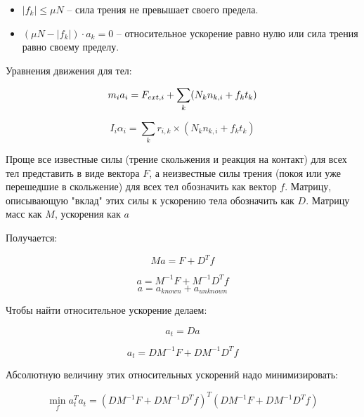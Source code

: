\documentclass{article}
\begin{document}
\begin{itemize}
    \item $|f_k| \le \mu N$ -- сила трения не превышает своего предела.
    \item $(\mu N - |f_k|) \cdot a_k = 0$ -- относительное ускорение равно нулю
        или сила трения равно своему пределу. 
\end{itemize}

Уравнения движения для тел:

\[
    m_i a_i = F_{ext,i} + \sum_{k} (N_k n_{k,i} + f_k t_k) \\
\]

\[
    I_i \alpha_i = \sum_{k} r_{i,k} \times (N_k n_{k,i} + f_k t_k)
\]

Проще все известные силы (трение скольжения и реакция на контакт) для всех тел представить в виде вектора $F$, а неизвестные силы трения
(покоя или уже перешедшие в скольжение) для всех тел обозначить как вектор $f$.
Матрицу, описывающую "вклад" этих силы к ускорению тела обозначить как $D$. Матрицу масс как $M$, ускорения как $a$ 

Получается:

\[ Ma = F + D^T f \]

\[ a = M^{-1} F + M^{-1} D^T f \]
\[ a = a_{known} + a_{unknown} \]

Чтобы найти относительное ускорение делаем:

\[ a_t = D a \]

\[ a_t = D M^{-1} F + D M^{-1} D^T f \]

Абсолютную величину этих относительных ускорений надо минимизировать:

\[ \min_{f} a_t^T a_t = (D M^{-1} F + D M^{-1} D^T f)^T (D M^{-1} F + D M^{-1} D^T f) \]
\end{document}
